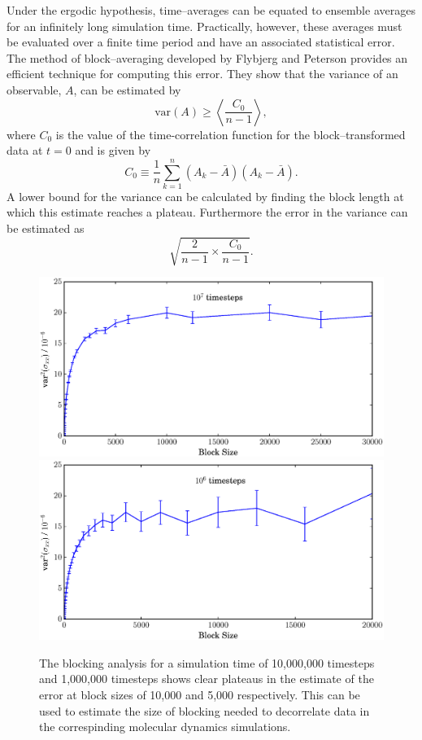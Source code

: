 Under the ergodic hypothesis, time--averages can be equated to ensemble averages for an infinitely long simulation time.\cite{Bopp2008}
Practically, however, these averages must be evaluated over a finite time period and have an associated statistical error.
The method of block--averaging developed by Flybjerg and Peterson provides an efficient technique for computing this error.\cite{Flyvbjerg1989}
They show that the variance of an observable, $A$, can be estimated by
\begin{equation}
\mathrm{var}(A) \geq \left< \frac{C_{0}}{n-1} \right>,
\end{equation}
where $C_{0}$ is the value of the time-correlation function for the block--transformed data at $t=0$ and is given by
\begin{equation}
C_{0} \equiv \frac{1}{n} \sum_{k=1}^{n} \left( A_{k} - \bar{A} \right) \left(A_{k} - \bar{A} \right).
\end{equation}
A lower bound for the variance can be calculated by finding the block length at which this estimate reaches a plateau.
Furthermore the error in the variance can be estimated as 
\begin{equation}
\sqrt{\frac{2}{n-1} \times \frac{C_{0}}{n-1}}.
\end{equation}

\begin{figure}[h]
\hspace{-4em}
        \includegraphics[scale=0.35]{block_average_10e6.eps}
        \includegraphics[scale=0.35]{block_average_1e6.eps}
	\caption{The blocking analysis for a simulation time of 10,000,000 timesteps and 1,000,000 timesteps shows clear plateaus in the estimate of the error at block sizes of 10,000 and 5,000 respectively.
This can be used to estimate the size of blocking needed to decorrelate data in the correspinding molecular dynamics simulations.}
\label{blocking}
\end{figure}

